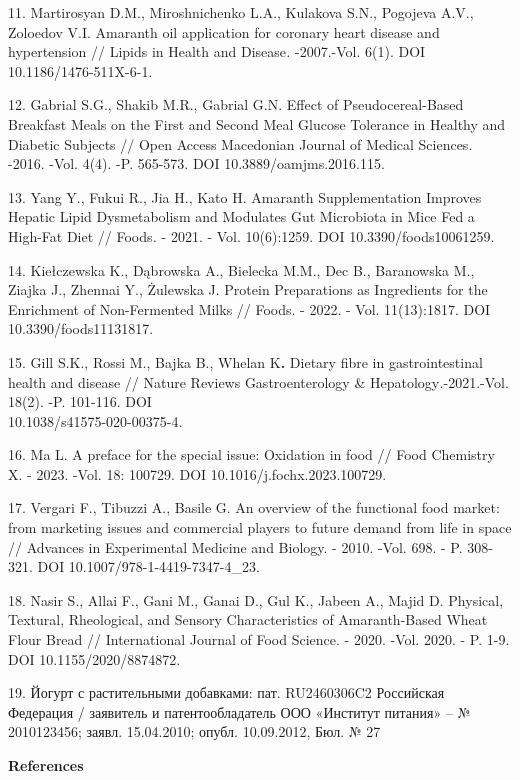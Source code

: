 \begin{references}
11. Martirosyan D.M., Miroshnichenko L.A., Kulakova S.N., Pogojeva A.V.,
Zoloedov V.I. Amaranth oil application for coronary heart disease and
hypertension // Lipids in Health and Disease\emph{.} -2007.-Vol. 6(1).
DOI 10.1186/1476-511X-6-1.

12. Gabrial S.G., Shakib M.R., Gabrial G.N. Effect of Pseudocereal-Based
Breakfast Meals on the First and Second Meal Glucose Tolerance in
Healthy and Diabetic Subjects // Open Access Macedonian Journal of
Medical Sciences. -2016. -Vol. 4(4). -P. 565-573.
DOI 10.3889/oamjms.2016.115.

13. Yang Y., Fukui R., Jia H., Kato H. Amaranth Supplementation Improves
Hepatic Lipid Dysmetabolism and Modulates Gut Microbiota in Mice Fed a
High-Fat Diet // Foods\emph{.} - 2021. - Vol. 10(6):1259. DOI
10.3390/foods10061259.

14. Kiełczewska K., Dąbrowska A., Bielecka M.M., Dec B., Baranowska M.,
Ziajka J., Zhennai Y., Żulewska J. Protein Preparations as Ingredients
for the Enrichment of Non-Fermented Milks // Foods. - 2022. - Vol.
11(13):1817. DOI 10.3390/foods11131817.

15. Gill S.K., Rossi M., Bajka B., Whelan K{\bfseries .} Dietary fibre in
gastrointestinal health and disease // Nature Reviews Gastroenterology
\& Hepatology\emph{.}-2021.-Vol. 18(2). -P. 101-116.
DOI \\10.1038/s41575-020-00375-4.

16. Ma L. A preface for the special issue: Oxidation in food // Food
Chemistry X. - 2023. -Vol. 18: 100729. DOI 10.1016/j.fochx.2023.100729.

17. Vergari F., Tibuzzi A., Basile G. An overview of the functional food
market: from marketing issues and commercial players to future demand
from life in space // Advances in Experimental Medicine and Biology. -
2010. -Vol. 698. - P. 308-321. DOI 10.1007/978-1-4419-7347-4\_23.

18. Nasir S., Allai F., Gani M., Ganai D., Gul K., Jabeen A., Majid D.
Physical, Textural, Rheological, and Sensory Characteristics of
Amaranth-Based Wheat Flour Bread // International Journal of Food
Science. - 2020. -Vol. 2020. - P. 1-9. DOI 10.1155/2020/8874872.

19. Йогурт с растительными добавками: пат. RU2460306C2 Российская
Федерация / заявитель и патентообладатель ООО «Институт питания» -- №
2010123456; заявл. 15.04.2010; опубл. 10.09.2012, Бюл. № 27
\end{references}

\begin{center}
{\bfseries References}
\end{center}

